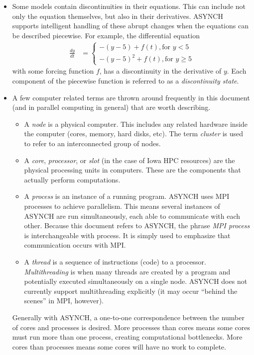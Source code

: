\documentclass[12pt]{article}
\begin{document}
\begin{itemize}
 
 \item Some models contain discontinuities in their equations. This can include not only the equation themselves, but also in their derivatives. ASYNCH supports intelligent handling of these abrupt changes when the equations can be described piecewise. For example, the differential equation
 \begin{align*}
  \frac{dy}{dt} &= \left\{ \begin{array}{c} -(y-5) + f(t), \mbox{for } y < 5 \\
                            -(y-5)^2 + f(t), \mbox{for } y \geq 5
                           \end{array} \right.
 \end{align*}
 with some forcing function $f$, has a discontinuity in the derivative of $y$. Each component of the piecewise function is referred to as a \emph{discontinuity state}.
 
 \item A few computer related terms are thrown around frequently in this document (and in parallel computing in general) that are worth describing.
 \begin{itemize}
  \item A \emph{node} is a physical computer. This includes any related hardware inside the computer (cores, memory, hard disks, etc). The term \emph{cluster} is used to refer to an interconnected group of nodes.
  \item A \emph{core}, \emph{processor}, or \emph{slot} (in the case of Iowa HPC resources) are the physical processing units in computers. These are the components that actually perform computations.
  \item A \emph{process} is an instance of a running program. ASYNCH uses MPI processes to achieve parallelism. This means several instances of ASYNCH are run simultaneously, each able to communicate with each other. Because this document refers to ASYNCH, the phrase \emph{MPI process} is interchangeable with process. It is simply used to emphasize that communication occurs with MPI.
  \item A \emph{thread} is a sequence of instructions (code) to a processor. \emph{Multithreading} is when many threads are created by a program and potentially executed simultaneously on a single node. ASYNCH does not currently support multithreading explicitly (it may occur ``behind the scenes'' in MPI, however).
 \end{itemize}
 Generally with ASYNCH, a one-to-one correspondence between the number of cores and processes is desired. More processes than cores means some cores must run more than one process, creating computational bottlenecks. More cores than processes means some cores will have no work to complete.
 
\end{itemize}
\end{document}
